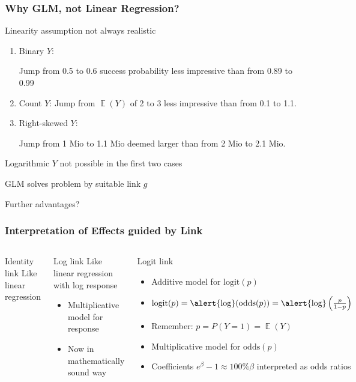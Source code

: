 \documentclass[
    utf8,
    aspectratio=169
]{beamer}  %
\DeclareMathOperator{\E}{\mathbb{E}}  %
\begin{document}
\begin{frame}
	\frametitle{Why GLM, not Linear Regression?}
	\begin{block}{Linearity assumption not always realistic}
		\begin{enumerate}
			\item Binary $Y$: 
			
			Jump from 0.5 to 0.6 success probability less impressive than from 0.89 to 0.99
			\item Count $Y$: Jump from $\E(Y)$ of 2 to 3 less impressive than from 0.1 to 1.1.
			\item Right-skewed $Y$: 
			
			Jump from 1 Mio to 1.1 Mio deemed larger than from 2 Mio to 2.1 Mio.
		\end{enumerate}
	\alert{Logarithmic $Y$ not possible in the first two cases}
	\end{block}

	\vfill
	
	\begin{block}{GLM solves problem by suitable link $g$}
	\end{block}
	
	\vfill
	
	\begin{block}{Further advantages?}
	\end{block}
\end{frame}

\begin{frame}
	\frametitle{Interpretation of Effects guided by Link}
	\begin{columns}[onlytextwidth]
		\begin{block}{Identity link}
			Like linear regression
		\end{block}
		
		\begin{block}{Log link}
			Like linear regression with log response
			\begin{itemize}
				\item Multiplicative model for response
				\item Now in mathematically sound way
			\end{itemize}
		\end{block}
		
		\begin{block}{Logit link}
			\begin{itemize}
				\item Additive model for $\text{logit}(p)$
				\item $\text{logit}(p) = \text{\alert{log}}(\text{odds}(p)) = \text{\alert{log}}\left(\frac{p}{1-p}\right)$
				\item Remember: $p = P(Y=1) = \E(Y)$				
				\item Multiplicative model for $\text{odds}(p)$
				\item Coefficients \alert{$e^\beta - 1 \approx 100\%\beta$} interpreted as odds ratios
			\end{itemize}
		\end{block}
	\end{columns}
\end{frame}
\end{document}
